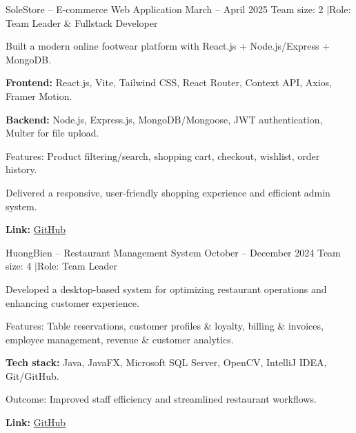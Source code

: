 \vspace{4pt}

\projectEntry
    {SoleStore -- E-commerce Web Application}
    {March -- April 2025}
    {Team size: 2 \enspace$\vert$\enspace Role: Team Leader \& Fullstack Developer}

\begin{entryItems}
    \item Built a modern online footwear platform with React.js + Node.js/Express + MongoDB.
    \item \textbf{Frontend:} React.js, Vite, Tailwind CSS, React Router, Context API, Axios, Framer Motion.
    \item \textbf{Backend:} Node.js, Express.js, MongoDB/Mongoose, JWT authentication, Multer for file upload.
    \item Features: Product filtering/search, shopping cart, checkout, wishlist, order history.
    \item Delivered a responsive, user-friendly shopping experience and efficient admin system.
    \item \textbf{Link:} \href{https://github.com/giasinguyen/solestore-ecommerce}{GitHub}
\end{entryItems}

\vspace{4pt}

\projectEntry
    {HuongBien -- Restaurant Management System}
    {October -- December 2024}
    {Team size: 4 \enspace$\vert$\enspace Role: Team Leader}

\begin{entryItems}
    \item Developed a desktop-based system for optimizing restaurant operations and enhancing customer experience.
    \item Features: Table reservations, customer profiles \& loyalty, billing \& invoices, employee management, revenue \& customer analytics.
    \item \textbf{Tech stack:} Java, JavaFX, Microsoft SQL Server, OpenCV, IntelliJ IDEA, Git/GitHub.
    \item Outcome: Improved staff efficiency and streamlined restaurant workflows.
    \item \textbf{Link:} \href{https://github.com/giasinguyen/huongbien-restaurant-system}{GitHub}
\end{entryItems}
